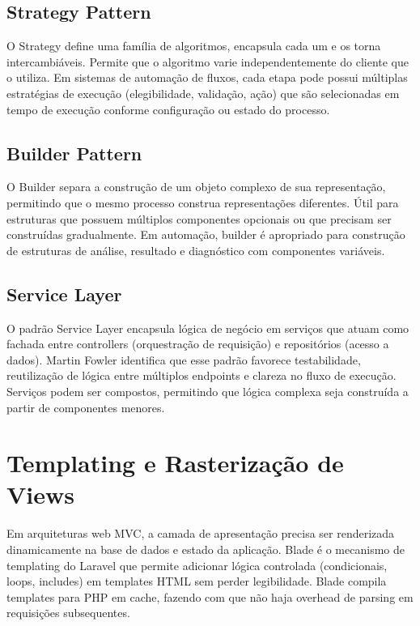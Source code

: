 \subsection{Strategy Pattern}
O Strategy define uma família de algoritmos, encapsula cada um e os torna
intercambiáveis. Permite que o algoritmo varie independentemente do cliente
que o utiliza. Em sistemas de automação de fluxos, cada etapa pode possui
múltiplas estratégias de execução (elegibilidade, validação, ação) que são
selecionadas em tempo de execução conforme configuração ou estado do processo.

\subsection{Builder Pattern}
O Builder separa a construção de um objeto complexo de sua representação,
permitindo que o mesmo processo construa representações diferentes. Útil para
estruturas que possuem múltiplos componentes opcionais ou que precisam ser
construídas gradualmente. Em automação, builder é apropriado para construção
de estruturas de análise, resultado e diagnóstico com componentes variáveis.

\subsection{Service Layer}
O padrão Service Layer encapsula lógica de negócio em serviços que atuam como
fachada entre controllers (orquestração de requisição) e repositórios (acesso
a dados). Martin Fowler \cite{ServiceLayerPattern2024} identifica que esse
padrão favorece testabilidade, reutilização de lógica entre múltiplos
endpoints e clareza no fluxo de execução. Serviços podem ser compostos,
permitindo que lógica complexa seja construída a partir de componentes menores.

\section{Templating e Rasterização de Views}
\label{sec:revbib:templates}

Em arquiteturas web MVC, a camada de apresentação precisa ser renderizada
dinamicamente na base de dados e estado da aplicação. Blade
\cite{Blade2024} é o mecanismo de templating do Laravel que permite adicionar
lógica controlada (condicionais, loops, includes) em templates HTML sem perder
legibilidade. Blade compila templates para PHP em cache, fazendo com que não
haja overhead de parsing em requisições subsequentes.

